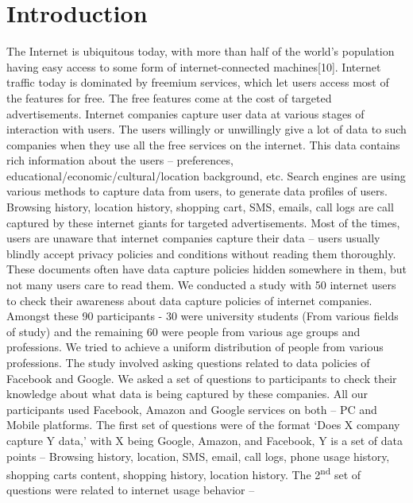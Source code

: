\documentclass[10pt, a4paper, twocolumn]{article} %
\begin{document}
\section{Introduction}
The Internet is ubiquitous today, with more than half of the world’s population having easy access to some form of internet-connected machines[10]. Internet traffic today is dominated by freemium services, which let users access most of the features for free. The free features come at the cost of targeted advertisements. Internet companies capture user data at various stages of interaction with users. The users willingly or unwillingly give a lot of data to such companies when they use all the free services on the internet. This data contains rich information about the users – preferences, educational/economic/cultural/location background, etc. Search engines are using various methods to capture data from users, to generate data profiles of users. Browsing history, location history, shopping cart, SMS, emails, call logs are call captured by these internet giants for targeted advertisements. Most of the times, users are unaware that internet companies capture their data – users usually blindly accept privacy policies and conditions without reading them thoroughly. These documents often have data capture policies hidden somewhere in them, but not many users care to read them. \newline
We conducted a study with 50 internet users to check their awareness about data capture policies of internet companies. Amongst these 90 participants - 30 were university students (From various fields of study) and the remaining 60 were people from various age groups and professions. We tried to achieve a uniform distribution of people from various professions. The study involved asking questions related to data policies of Facebook and Google. We asked a set of questions to participants to check their knowledge about what data is being captured by these companies. All our participants used Facebook, Amazon and Google services on both – PC and Mobile platforms. 	\newline
The first set of questions were of the format ‘Does X company capture Y data,’ with X being Google, Amazon, and Facebook, Y is a set of data points – Browsing history, location, SMS, email, call logs, phone usage history, shopping carts content, shopping history, location history. The 2\textsuperscript{nd} set of questions were related to internet usage behavior –
\end{document}
